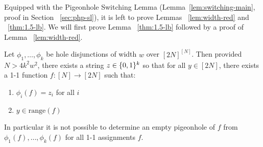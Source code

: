 Equipped with the Pigeonhole Switching Lemma (Lemma~\ref{lem:switching-main}, proof in Section ~\ref{sec:php-sl}), it is left to prove Lemmas ~\ref{lem:width-red} and ~\ref{thm:1.5-lb}.   We will first prove Lemma 
~\ref{thm:1.5-lb} followed by a proof of Lemma ~\ref{lem:width-red}. 


\begin{lemma}\label{thm:1.5-lb}
Let $\phi_1,\ldots,\phi_k$ be hole disjunctions of width $w$ over $[2N]^{[N]}$. Then provided $N > 4k^2w^2$, there exists a string $z \in \{0,1\}^k$ so that for all $y \in [2N]$, there exists a 1-1 function $f: [N] \rightarrow [2N]$ such that:
\begin{enumerate}
    \item $\phi_i(f) = z_i$ for all $i$
    \item $y \in \mathrm{range}(f)$
\end{enumerate}
In particular it is not possible to determine an empty pigeonhole of $f$ from $\phi_1(f),\ldots,\phi_k(f)$ for all 1-1 assignments $f$.
\end{lemma}

